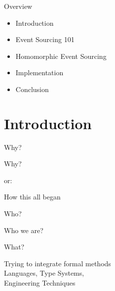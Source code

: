 \begin{frame}[fragile]{Overview}

\begin{itemize}
\item Introduction
\item Event Sourcing 101
\item Homomorphic Event Sourcing
\item Implementation
\item Conclusion
\end{itemize}

\end{frame}

\part{Introduction}

\begin{frame}[fragile]{Why?}

\begin{center}
{
\LARGE
Why?
}

\vspace{2em}

or:

\vspace{2em}

{
\Large
How this all began
}
\end{center}
\end{frame}


\begin{frame}[fragile]{Who?}

\begin{center}
{
\LARGE
Who we are?
}

\vspace{2em}
\end{center}
\end{frame}


\begin{frame}[fragile]{What?}

\begin{center}
{
\LARGE
Trying to integrate formal methods
\\[2em]
Languages, Type Systems, \\Engineering Techniques
}

\vspace{2em}
\end{center}
\end{frame}

